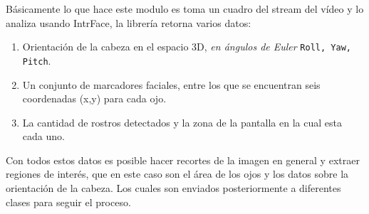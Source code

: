 \documentclass[12pt]{book} %
\begin{document}
		Básicamente lo que hace este modulo es toma un cuadro del stream del vídeo y lo analiza usando IntrFace, la librería retorna varios
		datos:
		\begin{multicols}{2}
			\begin{enumerate}
				\item Orientación de la cabeza en el espacio 3D, \textit{en ángulos de Euler} \texttt{Roll, Yaw, Pitch}.
				\item Un conjunto de marcadores faciales, entre los que se encuentran seis coordenadas (x,y) para cada ojo.
				\item La cantidad de rostros detectados y la zona de la pantalla en la cual esta cada uno.
			\end{enumerate}
		\end{multicols}
		Con todos estos datos es posible hacer recortes de la imagen en general y extraer regiones de interés, que en este caso son el 
		área  de los ojos y los datos sobre la orientación de la cabeza.
		Los cuales son enviados posteriormente a diferentes clases para seguir el proceso.
		
\end{document}
